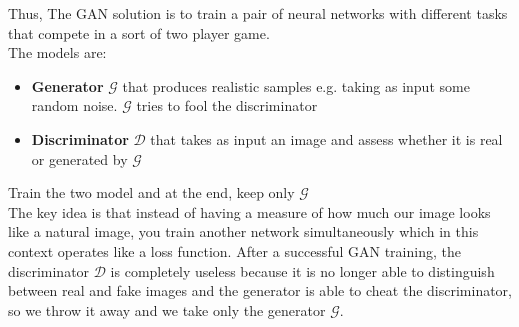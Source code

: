 Thus, The GAN solution is to train a pair of neural networks with different tasks that compete in a sort of two player game.\\
The models are:
\begin{itemize}
    \item \textbf{Generator} $\mathcal{G}$ that produces realistic samples e.g. taking as input some random noise. $\mathcal{G}$ tries to fool the discriminator
    
    \item \textbf{Discriminator} $\mathcal{D}$ that takes as input an image and assess whether it is real or generated by $\mathcal{G}$
\end{itemize}{}
Train the two model and at the end, keep only $\mathcal{G}$ \\

The key idea is that instead of having a measure of how much our image looks like a natural image, you train another network simultaneously which in this context operates like a loss function. After a successful GAN training, the discriminator $\mathcal{D}$ is completely useless because it is no longer able to distinguish between real and fake images and the generator is able to cheat the discriminator, so we throw it away and we take only the generator $\mathcal{G}$.

